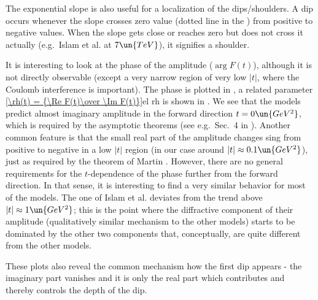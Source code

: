 The exponential slope is also useful for a localization of the dips/shoulders. A dip occurs whenever the slope crosses zero value (dotted line in the ) from positive to negative values. When the slope gets close or reaches zero but does not cross it actually (e.g.~Islam et al. at $7\un{TeV}$), it signifies a shoulder.


It is interesting to look at the phase of the amplitude ($\arg F(t)$), although it is not directly observable (except a very narrow region of very low $|t|$, where the Coulomb interference is important). The phase is plotted in , a related parameter 
\eqref{\rh(t) = {\Re F(t)\over \Im F(t)}}{el rh}
is shown in . We see that the models predict almost imaginary amplitude in the forward direction $t=0\un{GeV^2}$, which is required by the asymptotic theorems (see e.g.~Sec.~4 in ). Another common feature is that the small real part of the amplitude changes sing from positive to negative in a low $|t|$ region (in our case around $|t| \approx 0.1\un{GeV^2}$), just as required by the theorem of Martin . However, there are no general requirements for the $t$-dependence of the phase further from the forward direction. In that sense, it is interesting to find a very similar behavior for most of the models. The one of Islam et al. deviates from the trend above $|t|\approx 1\un{GeV^2}$; this is the point where the diffractive component of their amplitude (qualitatively similar mechanism to the other models) starts to be dominated by the other two components that, conceptually, are quite different from the other models.

These plots also reveal the common mechanism how the first dip appears - the imaginary part vanishes and it is only the real part which contributes and thereby controls the depth of the dip.



